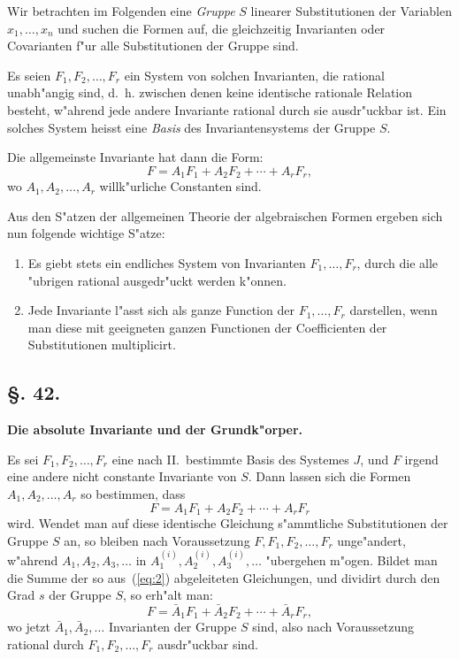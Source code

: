 \documentclass[12pt,a4paper]{article}
\theoremstyle{weber}
\begin{document}
Wir betrachten im Folgenden eine \textit{Gruppe} $S$ linearer Substitutionen der Variablen $x_1, \ldots, x_n$ und suchen die Formen auf, die gleichzeitig Invarianten oder Covarianten f"ur alle Substitutionen der Gruppe sind.

Es seien $F_1, F_2, \ldots, F_r$ ein System von solchen Invarianten, die rational unabh"angig sind, d.~h. zwischen denen keine identische rationale Relation besteht, w"ahrend jede andere Invariante rational durch sie ausdr"uckbar ist. Ein solches System heisst eine \textit{Basis} des Invariantensystems der Gruppe $S$.

Die allgemeinste Invariante hat dann die Form:
\begin{equation}\label{eq:1}
F = A_1 F_1 + A_2 F_2 + \cdots + A_r F_r,
\end{equation}
wo $A_1, A_2, \ldots, A_r$ willk"urliche Constanten sind.

Aus den S"atzen der allgemeinen Theorie der algebraischen Formen ergeben sich nun folgende wichtige S"atze:

\begin{enumerate}[label=\Roman*.]
\item Es giebt stets ein endliches System von Invarianten $F_1, \ldots, F_r$, durch die alle "ubrigen rational ausgedr"uckt werden k"onnen.
\item Jede Invariante l"asst sich als ganze Function der $F_1, \ldots, F_r$ darstellen, wenn man diese mit geeigneten ganzen Functionen der Coefficienten der Substitutionen multiplicirt.
\end{enumerate}


\newpage
\subsection*{\S. 42.}

\begin{center}
\textbf{Die absolute Invariante und der Grundk"orper.}
\end{center}

\bigskip

Es sei $F_1, F_2, \ldots, F_r$ eine nach II.~bestimmte Basis des Systemes $J$, und $F$ irgend eine andere nicht constante Invariante von $S$. Dann lassen sich die Formen $A_1, A_2, \ldots, A_r$ so bestimmen, dass
\begin{equation}\label{eq:2}
F = A_1 F_1 + A_2 F_2 + \cdots + A_r F_r
\end{equation}
wird. Wendet man auf diese identische Gleichung s"ammtliche Substitutionen der Gruppe $S$ an, so bleiben nach Voraussetzung $F, F_1, F_2, \ldots, F_r$ unge"andert, w"ahrend $A_1, A_2, A_3, \ldots$ in $A_1^{(i)}, A_2^{(i)}, A_3^{(i)}, \ldots$ "ubergehen m"ogen. Bildet man die Summe der so aus~(\ref{eq:2}) abgeleiteten Gleichungen, und dividirt durch den Grad $s$ der Gruppe $S$, so erh"alt man:
\begin{equation}\label{eq:3}
F = \bar{A}_1 F_1 + \bar{A}_2 F_2 + \cdots + \bar{A}_r F_r,
\end{equation}
wo jetzt $\bar{A}_1, \bar{A}_2, \ldots$ Invarianten der Gruppe $S$ sind, also nach Voraussetzung rational durch $F_1, F_2, \ldots, F_r$ ausdr"uckbar sind.
\end{document}

